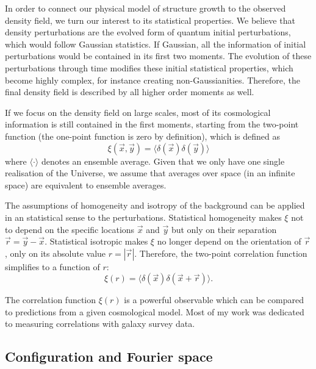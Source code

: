     In order to connect our physical model of structure growth to the observed density field,
    we turn our interest to its statistical properties. We believe that density perturbations 
    are the evolved form of quantum initial perturbations, which would follow Gaussian statistics. 
    If Gaussian, all the information of initial perturbations would be contained in its first two moments.
    The evolution of these perturbations through time modifies these initial statistical properties,
    which become highly complex, for instance creating non-Gaussianities. 
    Therefore, the final density field is described by all higher order moments as well.  

    If we focus on the density field on large scales, most of its cosmological information is
    still contained in the first moments, starting from the
    two-point function (the one-point function is zero by definition),
    which is defined as
    \begin{equation}
        \xi(\vec{x}, \vec{y}) = \langle \delta(\vec{x}) \delta(\vec{y})\rangle 
        \label{eq:two_point_function_config_space}
    \end{equation}
    where $\langle \cdot \rangle$ denotes an ensemble average. Given that
    we only have one single realisation of the Universe, we assume that
    averages over space (in an infinite space) are equivalent to ensemble averages.

    The assumptions of homogeneity and isotropy of the background can be 
    applied in an statistical sense to the perturbations. Statistical 
    homogeneity makes $\xi$ not to depend on the specific locations $\vec{x}$
    and $\vec{y}$ but only on their separation $\vec{r} = \vec{y}-\vec{x}$. 
    Statistical isotropic makes $\xi$ no longer depend on the orientation of
    $\vec{r}$, only on its absolute value $r = |\vec{r}|$. 
    Therefore, the two-point correlation function simplifies to a function of $r$:
    \begin{equation}
        \xi(r) = \langle \delta(\vec{x}) \delta(\vec{x}+\vec{r})\rangle. 
        \label{eq:two_point_function_config_space_iso_homo}
    \end{equation}
    
    The correlation function $\xi(r)$ is a powerful observable which can 
    be compared to predictions from a given cosmological model. 
    Most of my work was dedicated to measuring correlations with galaxy survey data. 

    
    \subsection{Configuration and Fourier space}
    \label{intro:lss:config_fourier}

